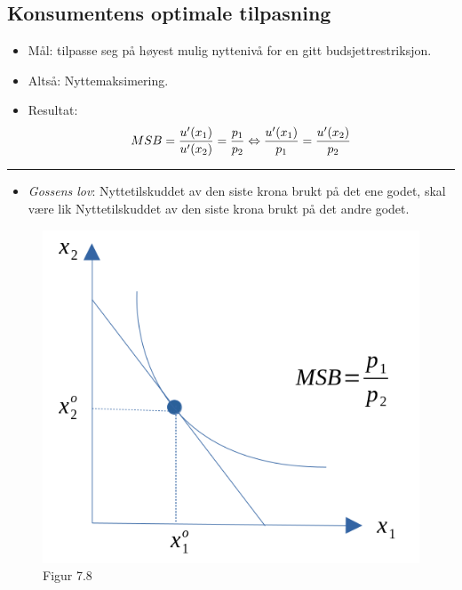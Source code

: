 \documentclass[
  letterpaper,
  DIV=11,
  numbers=noendperiod]{scrartcl}
\providecommand{\tightlist}{%
  \setlength{\itemsep}{0pt}\setlength{\parskip}{0pt}}\usepackage{longtable,booktabs,array}
\begin{document}
\subsection{Konsumentens optimale
tilpasning}\label{konsumentens-optimale-tilpasning}

\begin{itemize}
\tightlist
\item
  Mål: tilpasse seg på høyest mulig nyttenivå for en gitt
  budsjettrestriksjon.
\item
  Altså: Nyttemaksimering.
\item
  Resultat: \begin{equation*}
  MSB=\frac{u'({x_{1}})}{u'({x_{2}})}=\frac{p_1}{p_2} \Leftrightarrow \\
  \frac{u'({x_{1}})}{p_{1}}=\frac{u'({x_{2}})}{p_{2}}
  \end{equation*}
\end{itemize}

\begin{center}\rule{0.5\linewidth}{0.5pt}\end{center}

\begin{itemize}
\tightlist
\item
  \emph{Gossens lov}: Nyttetilskuddet av den siste krona brukt på det
  ene godet, skal være lik Nyttetilskuddet av den siste krona brukt på
  det andre godet.
\end{itemize}

\begin{figure}[H]

{\centering \includegraphics[width=1\textwidth,height=\textheight]{drawio/opttilp.png}

}

\caption{Figur 7.8}

\end{figure}%
\end{document}
